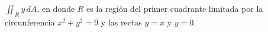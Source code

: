 \item $\iint_R y \, dA$, en donde $R$ es la región del primer cuadrante limitada por la circunferencia $x^2 + y^2 = 9$ y las rectas $y = x$ y $y = 0$.
